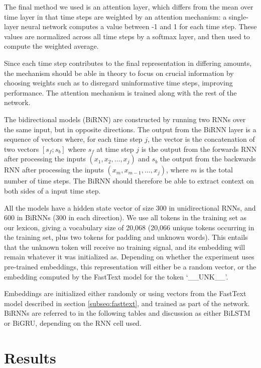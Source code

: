 The final method we used is an attention layer, which differs from the mean
over time layer in that time steps are weighted by an attention mechanism: a
single-layer neural network computes a value between -1 and 1 for each time
step. These values are normalized across all time steps by a softmax layer,
and then used to compute the weighted average.

Since each time step contributes to the final representation in differing
amounts, the mechanism should be able in theory to focus on crucial
information by choosing weights such as to disregard uninformative time
steps, improving performance. The attention mechanism is trained along with
the rest of the network.

The bidirectional models (BiRNN) are constructed by running two \acp{RNN}
over the same input, but in opposite directions. The output from the BiRNN
layer is a sequence of vectors where, for each time step $j$, the vector is
the concatenation of two vectors $[s_f;s_b]$ where $s_f$ at time step $j$ is
the output from the forwards \ac{RNN} after processing the inputs $(x_1, x_2,
\ldots, x_j)$ and $s_b$ the output from the backwards \ac{RNN} after
processing the inputs $(x_m, x_{m-1}, \ldots, x_j)$, where $m$ is the total
number of time steps. The BiRNN should therefore be able to extract context
on both sides of a input time step.

All the models have a hidden state vector of size 300 in unidirectional
\acp{RNN}, and 600 in BiRNNs (300 in each direction). We use all tokens in
the training set as our lexicon, giving a vocabulary size of 20,068 (20,066
unique tokens occurring in the training set, plus two tokens for padding and
unknown words). This entails that the unknown token will receive no training
signal, and its embedding will remain whatever it was initialized as.
Depending on whether the experiment uses pre-trained embeddings, this
representation will either be a random vector, or the embedding computed by
the FastText model for the token `\_\_UNK\_\_'. 

Embeddings are initialized either randomly or using vectors
from the FastText model described in section \ref{subseq:fasttext}, and
trained as part of the network. BiRNNs are referred to in the following
tables and discussion as either BiLSTM or BiGRU, depending on the RNN cell
used.


\section{Results}

